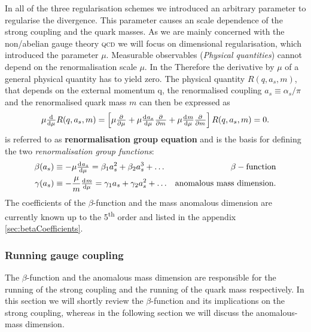 \documentclass[../../index.tex]{subfiles}
\begin{document}
In all of the three regularisation schemes we introduced an arbitrary parameter
to regularise the divergence. This parameter causes an scale dependence of the
strong coupling and the quark masses. As we are mainly concerned with the
non\-/abelian gauge theory \textsc{qcd} we will focus on dimensional
regularisation, which introduced the parameter $\mu$. Measurable observables
(\textit{Physical quantities}) cannot depend on the renormalisation scale $\mu$.
In the Therefore the derivative by $\mu$ of a general
physical quantity has to yield zero. The physical quantity $R(q, a_s, m)$, that
depends on the external momentum q, the renormalised coupling
$a_s\equiv\alpha_s/\pi$ and the renormalised quark mass $m$ can then be
expressed as
\begin{equation}
  \label{eq:RGE}
  \mu \od{}{\mu}R(q, a_s, m) = \left[ \mu \pd{}{\mu} + \mu \od{a_s}{\mu} \pd{}{m} + \mu \od{m}{\mu} \pd{}{m} \right] R(q, a_s, m) = 0.
\end{equation}
 is referred to as \textbf{renormalisation group equation} and is
the basis for defining the two \textit{renormalisation group functions}:
\begin{align}
  \beta(a_s) &\equiv -\mu \od{a_s}{\mu} = \beta_1 a_s^2 + \beta_2 a_s^3 + \dots & \beta-\text{function}
                                                                                  \label{eq:betaFunction} \\
  \gamma(a_s) &\equiv - \frac{\mu}{m} \od{m}{\mu} = \gamma_1 a_s + \gamma_2 a_s^2 + \dots & \text{anomalous mass dimension}.
                                                                                            \label{eq:anomalousMassDimension}
\end{align}
The coefficients of the $\beta$-function and the mass anomalous dimension are
currently known up to the 5\textsuperscript{th} order and listed in the appendix
\ref{sec:betaCoefficients}.

\subsubsection{Running gauge coupling}
The $\beta$-function and the anomalous mass dimension are responsible for the
running of the strong coupling and the running of the quark mass respectively.
In this section we will shortly review the $\beta$-function and its implications
on the strong coupling, whereas in the following section we will discuss the
anomalous-mass dimension.
\end{document}
